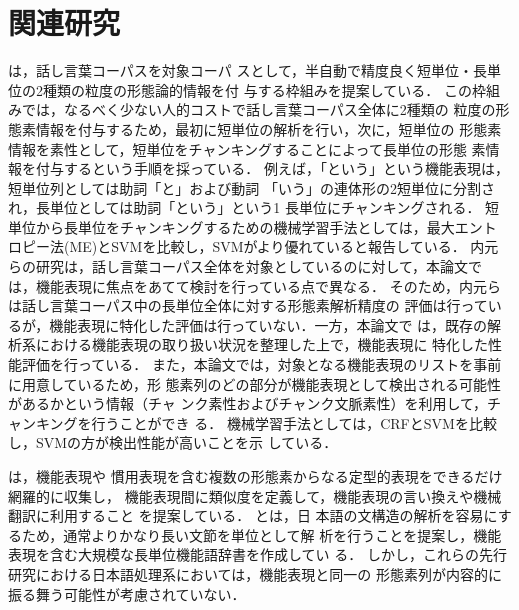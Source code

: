 \documentclass[japanese]{jnlp_1.3e}
\begin{document}
\section{関連研究}
\label{sec:関連研究}

\cite{Uchimoto04aj,Uchimoto04}は，話し言葉コーパス\cite{CSJ}を対象コーパ
スとして，半自動で精度良く短単位・長単位の2種類の粒度の形態論的情報を付
与する枠組みを提案している．
この枠組みでは，なるべく少ない人的コストで話し言葉コーパス全体に2種類の
粒度の形態素情報を付与するため，最初に短単位の解析を行い，次に，短単位の
形態素情報を素性として，短単位をチャンキングすることによって長単位の形態
素情報を付与するという手順を採っている．
例えば，「という」という機能表現は，短単位列としては助詞「と」および動詞
「いう」の連体形の2短単位に分割され，長単位としては助詞「という」という1 
長単位にチャンキングされる．
短単位から長単位をチャンキングするための機械学習手法としては，最大エント
ロピー法(ME)とSVMを比較し，SVMがより優れていると報告している．
内元らの研究は，話し言葉コーパス全体を対象としているのに対して，本論文で
は，機能表現に焦点をあてて検討を行っている点で異なる．
そのため，内元らは話し言葉コーパス中の長単位全体に対する形態素解析精度の
評価は行っているが，機能表現に特化した評価は行っていない．一方，本論文で
は，既存の解析系における機能表現の取り扱い状況を整理した上で，機能表現に
特化した性能評価を行っている．
また，本論文では，対象となる機能表現のリストを事前に用意しているため，形
態素列のどの部分が機能表現として検出される可能性があるかという情報（チャ
ンク素性およびチャンク文脈素性）を利用して，チャンキングを行うことができ
る．
機械学習手法としては，CRFとSVMを比較し，SVMの方が検出性能が高いことを示
している．

\cite{shudo.coling80,shudo.NL88,shudo.NLC98,shudo.mwe2004}は，機能表現や
慣用表現を含む複数の形態素からなる定型的表現をできるだけ網羅的に収集し，
機能表現間に類似度を定義して，機能表現の言い換えや機械翻訳に利用すること
を提案している．
\cite{hyoudo.NLC98,hyoudo.NLP99,hyoudo.NLP00}と\cite{isaji.NLP04}は，日
本語の文構造の解析を容易にするため，通常よりかなり長い文節を単位として解
析を行うことを提案し，機能表現を含む大規模な長単位機能語辞書を作成してい
る．
しかし，これらの先行研究における日本語処理系においては，機能表現と同一の
形態素列が内容的に振る舞う可能性が考慮されていない．
\end{document}
